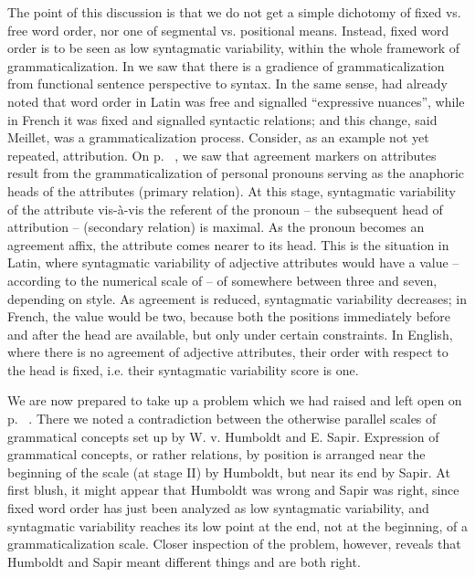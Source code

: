 The point of this discussion is that we do not get a simple dichotomy of fixed vs. free word order, nor one of segmental vs. positional means. Instead, fixed word order is to be seen as low syntagmatic variability, within the whole framework of grammaticalization. In  we saw that there is a gradience of grammaticalization from functional sentence perspective to syntax. In the same sense, \citet[147f]{Meillet1912} had already noted that word order in Latin was free and signalled “expressive nuances”, while in French it was fixed and signalled syntactic relations; and this change, said Meillet, was a grammaticalization process. Consider, as an example not yet repeated, attribution. On p.~\pageref{page77}\chk%
, we saw that agreement markers on attributes result from the grammaticalization of personal pronouns serving as the anaphoric heads of the attributes (primary relation). At this stage, syntagmatic variability of the attribute vis-à-vis the referent of the pronoun -- the subsequent head of attribution -- (secondary relation) is maximal. As the pronoun becomes an agreement affix, the attribute comes nearer to its head. This is the situation in Latin, where syntagmatic variability of adjective attributes would have a value -- according to the numerical scale of  -- of somewhere between three and seven, depending on style. As agreement is reduced, syntagmatic variability decreases; in French, the value would be two, because both the positions immediately before and after the head are available, but only under certain constraints. In English, where there is no agreement of adjective attributes, their order with respect to the head is fixed, i.e. their syntagmatic variability score is one.

We are now prepared to take up a problem which we had raised and left open on p.~\pageref{page6}\chk%
. There we noted a contradiction between the otherwise parallel scales of grammatical concepts set up by W. v. Humboldt and E. Sapir. Expression of grammatical concepts, or rather relations, by position is arranged near the beginning of the scale (at stage II) by Humboldt, but near its end by Sapir. At first blush, it might appear that Humboldt was wrong and Sapir was right, since fixed word order has just been analyzed as low syntagmatic variability, and syntagmatic variability reaches its low point at the end, not at the beginning, of a grammaticalization scale. Closer inspection of the problem, however, reveals that Humboldt and Sapir meant different things and are both right.

